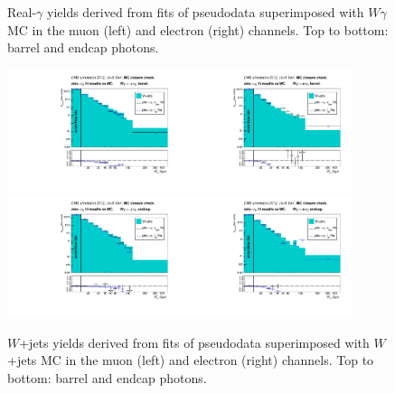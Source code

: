 \begin{figure}[htb]
\begin{center}
  \caption{Real-$\gamma$ yields derived from fits of pseudodata superimposed with $W\gamma$ MC in the muon (left) and electron (right) channels. Top to bottom: barrel and endcap photons.}
  \label{fig:TrueDDvsMC_MCclosureWjetsPlusWg}
  \end{center}
\end{figure}

 \begin{figure}[htb]
  \begin{center}
   \includegraphics[width=0.45\textwidth]{../figs/figs_v11/MUON_WGamma/MCclosureWjetsPlusWg/c_FakeDDvsMC_c_MUON_WGamma__UNblind_MCclosure__Barrel__phoEt_MCclosure.pdf}\includegraphics[width=0.45\textwidth]{../figs/figs_v11/ELECTRON_WGamma/MCclosureWjetsPlusWg/c_FakeDDvsMC_c_ELECTRON_WGamma__UNblind_MCclosure__Barrel__phoEt_MCclosure.pdf}
   \includegraphics[width=0.45\textwidth]{../figs/figs_v11/MUON_WGamma/MCclosureWjetsPlusWg/c_FakeDDvsMC_c_MUON_WGamma__UNblind_MCclosure__Endcap__phoEt_MCclosure.pdf}\includegraphics[width=0.45\textwidth]{../figs/figs_v11/ELECTRON_WGamma/MCclosureWjetsPlusWg/c_FakeDDvsMC_c_ELECTRON_WGamma__UNblind_MCclosure__Endcap__phoEt_MCclosure.pdf}
  \caption{$W$+jets yields derived from fits of pseudodata superimposed with $W$+jets MC in the muon (left) and electron (right) channels. Top to bottom: barrel and endcap photons.}
  \label{fig:FakeDDvsMC_MCclosureWjetsPlusWg}
  \end{center}
\end{figure}


